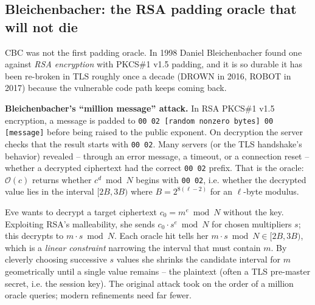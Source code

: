 \subsection{Bleichenbacher: the RSA padding oracle that will not die}
\label{ch37:bleichenbacher}

CBC was not the first padding oracle. In 1998 Daniel Bleichenbacher found one against \emph{RSA encryption} with PKCS\#1 v1.5 padding, and it is so durable it has been re-broken in TLS roughly once a decade (DROWN in 2016, ROBOT in 2017) because the vulnerable code path keeps coming back.

\begin{attackbox}
\textbf{Bleichenbacher's ``million message'' attack.} In RSA PKCS\#1 v1.5 encryption, a message is padded to \texttt{00 02 [random nonzero bytes] 00 [message]} before being raised to the public exponent. On decryption the server checks that the result starts with \texttt{00 02}. Many servers (or the TLS handshake's behavior) revealed -- through an error message, a timeout, or a connection reset -- whether a decrypted ciphertext had the correct \texttt{00 02} prefix. That is the oracle: $\mathcal{O}(c)$ returns whether $c^{d} \bmod N$ begins with \texttt{00 02}, i.e. whether the decrypted value lies in the interval $[2B, 3B)$ where $B = 2^{8(\ell - 2)}$ for an $\ell$-byte modulus.

Eve wants to decrypt a target ciphertext $c_0 = m^{e} \bmod N$ without the key. Exploiting RSA's malleability, she sends $c_0 \cdot s^{e} \bmod N$ for chosen multipliers $s$; this decrypts to $m \cdot s \bmod N$. Each oracle hit tells her $m\cdot s \bmod N \in [2B, 3B)$, which is a \emph{linear constraint} narrowing the interval that must contain $m$. By cleverly choosing successive $s$ values she shrinks the candidate interval for $m$ geometrically until a single value remains -- the plaintext (often a TLS pre-master secret, i.e. the session key). The original attack took on the order of a million oracle queries; modern refinements need far fewer.
\end{attackbox}


